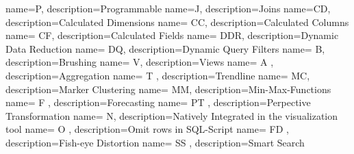 {
    name=P,
    description={Programmable}
}
{
    name=J,
    description={Joins}
}
{
    name=CD,
    description={Calculated Dimensions}
}
{
    name= CC,
    description={Calculated Columns}
}
{
    name= CF,
    description={Calculated Fields}
}
{
    name= DDR,
    description={Dynamic Data Reduction}
}
{
    name= DQ,
    description={Dynamic Query Filters}
}
{
    name= B,
    description={Brushing}
}
{
    name= V,
    description={Views}
}
{
    name= A ,
    description={Aggregation}
}
{
    name= T ,
    description={Trendline}
}
{
    name=  MC,
    description={Marker Clustering}
}
{
    name= MM,
    description={Min-Max-Functions}
}
{
    name= F ,
    description={Forecasting}
}
{
    name= PT ,
    description={Perpective Transformation}
}
{
    name= N,
    description={Natively Integrated in the visualization tool }
}
{
    name= O ,
    description={Omit rows in SQL-Script}
}
{
    name= FD ,
    description={Fish-eye Distortion}
}
{
    name= SS ,
    description={Smart Search}
}
